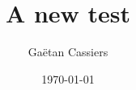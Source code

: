 \documentclass[english,frenchb, 10pt, oneside, headings=normal]{scrartcl}
\begin{document}
\titlehead{}
\subject{}
\title{A new test}
\subtitle{}
\author{Gaëtan Cassiers}
\date{\today}
\publishers{}

\maketitle
\end{document}
